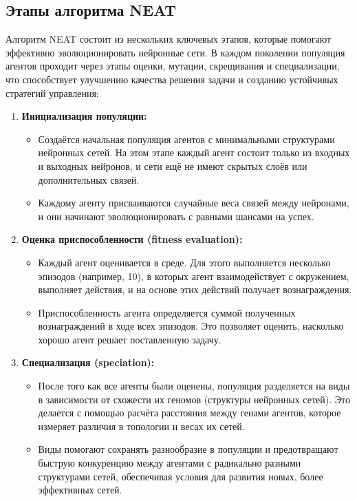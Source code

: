 \documentclass[a4paper,12pt]{article}
\begin{document}
\subsection{Этапы алгоритма NEAT}
Алгоритм NEAT состоит из нескольких ключевых этапов, которые помогают эффективно эволюционировать нейронные сети. В каждом поколении популяция агентов проходит через этапы оценки, мутации, скрещивания и специализации, что способствует улучшению качества решения задачи и созданию устойчивых стратегий управления:
\begin{enumerate}
    \item \textbf{Инициализация популяции:}
    \begin{itemize}
        \item Создаётся начальная популяция агентов с минимальными структурами нейронных сетей. На этом этапе каждый агент состоит только из входных и выходных нейронов, и сети ещё не имеют скрытых слоёв или дополнительных связей.
        \item Каждому агенту присваиваются случайные веса связей между нейронами, и они начинают эволюционировать с равными шансами на успех.
    \end{itemize}

    \item \textbf{Оценка приспособленности (fitness evaluation):}
    \begin{itemize}
        \item Каждый агент оценивается в среде. Для этого выполняется несколько эпизодов (например, 10), в которых агент взаимодействует с окружением, выполняет действия, и на основе этих действий получает вознаграждения.
        \item Приспособленность агента определяется суммой полученных вознаграждений в ходе всех эпизодов. Это позволяет оценить, насколько хорошо агент решает поставленную задачу.
    \end{itemize}

    \item \textbf{Специализация (speciation):}
    \begin{itemize}
        \item После того как все агенты были оценены, популяция разделяется на виды в зависимости от схожести их геномов (структуры нейронных сетей). Это делается с помощью расчёта расстояния между генами агентов, которое измеряет различия в топологии и весах их сетей.
        \item Виды помогают сохранять разнообразие в популяции и предотвращают быструю конкуренцию между агентами с радикально разными структурами сетей, обеспечивая условия для развития новых, более эффективных сетей.
    \end{itemize}


\end{enumerate}
\end{document}
